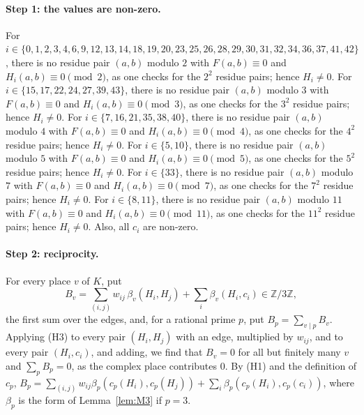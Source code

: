 \documentclass[11pt]{article}
\newcommand{\Z}{\mathbb{Z}}
\begin{document}
\paragraph{Step 1: the values are non-zero.} For $i\in\{0,\allowbreak 1,\allowbreak 2,\allowbreak 3,\allowbreak 4,\allowbreak 6,\allowbreak 9,\allowbreak 12,\allowbreak 13,\allowbreak 14,\allowbreak 18,\allowbreak 19,\allowbreak 20,\allowbreak 23,\allowbreak 25,\allowbreak 26,\allowbreak 28,\allowbreak 29,\allowbreak 30,\allowbreak 31,\allowbreak 32,\allowbreak 34,\allowbreak 36,\allowbreak 37,\allowbreak 41,\allowbreak 42\}$, there is no residue pair $(a,b)$ modulo $2$ with $F(a,b)\equiv0$ and $H_i(a,b)\equiv0\pmod{2}$, as one checks for the $2^2$ residue pairs; hence $H_i\neq0$. For $i\in\{15,\allowbreak 17,\allowbreak 22,\allowbreak 24,\allowbreak 27,\allowbreak 39,\allowbreak 43\}$, there is no residue pair $(a,b)$ modulo $3$ with $F(a,b)\equiv0$ and $H_i(a,b)\equiv0\pmod{3}$, as one checks for the $3^2$ residue pairs; hence $H_i\neq0$. For $i\in\{7,\allowbreak 16,\allowbreak 21,\allowbreak 35,\allowbreak 38,\allowbreak 40\}$, there is no residue pair $(a,b)$ modulo $4$ with $F(a,b)\equiv0$ and $H_i(a,b)\equiv0\pmod{4}$, as one checks for the $4^2$ residue pairs; hence $H_i\neq0$. For $i\in\{5,\allowbreak 10\}$, there is no residue pair $(a,b)$ modulo $5$ with $F(a,b)\equiv0$ and $H_i(a,b)\equiv0\pmod{5}$, as one checks for the $5^2$ residue pairs; hence $H_i\neq0$. For $i\in\{33\}$, there is no residue pair $(a,b)$ modulo $7$ with $F(a,b)\equiv0$ and $H_i(a,b)\equiv0\pmod{7}$, as one checks for the $7^2$ residue pairs; hence $H_i\neq0$. For $i\in\{8,\allowbreak 11\}$, there is no residue pair $(a,b)$ modulo $11$ with $F(a,b)\equiv0$ and $H_i(a,b)\equiv0\pmod{11}$, as one checks for the $11^2$ residue pairs; hence $H_i\neq0$. Also, all $c_i$ are non-zero.

\paragraph{Step 2: reciprocity.} For every place $v$ of $K$, put
\begin{equation}\label{eq:B}
B_v=\sum_{(i,j)}w_{ij}\,\beta_v(H_i,H_j)+\sum_i\beta_v(H_i,c_i)\in\Z/3\Z,
\end{equation}
the first sum over the edges, and, for a rational prime $p$, put $B_p=\sum_{v\mid p}B_v$. Applying (H3) to every pair $(H_i,H_j)$ with an edge, multiplied by $w_{ij}$, and to every pair $(H_i,c_i)$, and adding, we find that $B_v=0$ for all but finitely many $v$ and $\sum_pB_p=0$, as the complex place contributes $0$. By (H1) and the definition of $c_p$, $B_p=\sum_{(i,j)}w_{ij}\beta_p(c_p(H_i),c_p(H_j))+\sum_i\beta_p(c_p(H_i),c_p(c_i))$, where $\beta_p$ is the form of Lemma~\ref{lem:M3} if $p=3$.
\end{document}
